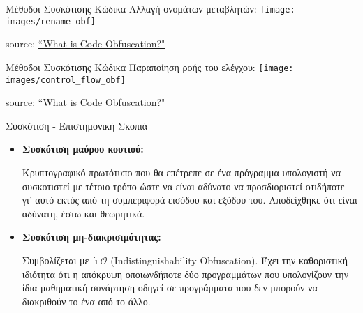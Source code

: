 \documentclass[xcolor=dvipsnames]{beamer}
\newcommand{\lt}{\latintext}
\newcommand{\ios}{\dot{\imath}\mathcal{O}}
\begin{document}
\begin{frame}{Μέθοδοι Συσκότισης Κώδικα}
Αλλαγή ονομάτων μεταβλητών:
\texttt{[image: images/rename\_obf]}

\hfill

{\lt source: \href{https://www.preemptive.com/obfuscation/}{\lt ``What is Code Obfuscation?"}}
\end{frame}

\begin{frame}{Μέθοδοι Συσκότισης Κώδικα}
Παραποίηση ροής του ελέγχου:
\texttt{[image: images/control\_flow\_obf]}

\hfill

{\lt source: \href{https://www.preemptive.com/obfuscation/}{\lt ``What is Code Obfuscation?"}}
\end{frame}

\begin{frame}{Συσκότιση - Επιστημονική Σκοπιά}
\begin{itemize}
	\item \textbf{Συσκότιση μαύρου κουτιού:}
	
	Κρυπτογραφικό πρωτότυπο που θα επέτρεπε σε ένα πρόγραμμα υπολογιστή να συσκοτιστεί με τέτοιο τρόπο ώστε να είναι αδύνατο να προσδιοριστεί οτιδήποτε γι' αυτό εκτός από τη συμπεριφορά εισόδου και εξόδου του. Αποδείχθηκε ότι είναι αδύνατη, έστω και θεωρητικά. \pause
	
	\hfill	

	\item \textbf{Συσκότιση μη-διακρισιμότητας:}
	
	Συμβολίζεται με $\ios$ ({\lt Indistinguishability Obfuscation}). Έχει την καθοριστική ιδιότητα ότι η απόκρυψη οποιωνδήποτε δύο προγραμμάτων που υπολογίζουν την ίδια μαθηματική συνάρτηση οδηγεί σε προγράμματα που δεν μπορούν να διακριθούν το ένα από το άλλο.
\end{itemize}
\end{frame}
\end{document}
